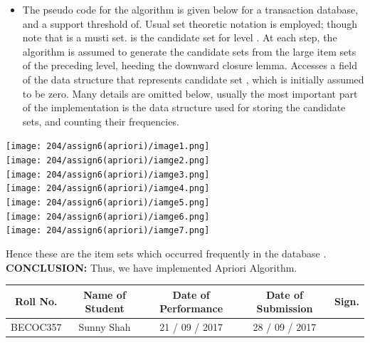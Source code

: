 \documentclass[11pt]{article}
\begin{document}
	\begin{itemize}
		\item The pseudo code for the algorithm is given below for a transaction database, and a
		support threshold of. Usual set theoretic notation is employed; though note that is a musti
		set. is the candidate set for level . At each step, the algorithm is assumed to generate the
		candidate sets from the large item sets of the preceding level, heeding the downward
		closure lemma. Accesses a field of the data structure that represents candidate set , which
		is initially assumed to be zero. Many details are omitted below, usually the most
		important part of the implementation is the data structure used for storing the candidate
		sets, and counting their frequencies.
	\end{itemize}
	
	\begin{center}
		\texttt{[image: 204/assign6(apriori)/image1.png]} \\
		\texttt{[image: 204/assign6(apriori)/iamge2.png]} \\
		\texttt{[image: 204/assign6(apriori)/iamge3.png]} \\
		\texttt{[image: 204/assign6(apriori)/iamge4.png]} \\
		\texttt{[image: 204/assign6(apriori)/iamge5.png]} \\
		\texttt{[image: 204/assign6(apriori)/iamge6.png]} \\
		\texttt{[image: 204/assign6(apriori)/iamge7.png]} \\
	\end{center}
	
	Hence these are the item sets which occurred frequently in the database . \\
	
	\noindent \textbf{ CONCLUSION:}
	Thus, we have implemented Apriori Algorithm.
	
	\begin{center}
		\begin{tabular}
			{|c|c|c|c|c|}\hline
			{\bf Roll No.}		&{\bf Name of Student}	&{\bf Date of Performance}  				&{\bf Date of Submission}	&{\bf Sign.}  \\    \hline
			BECOC357	& Sunny Shah  & 21 / 09 / 2017		& 28 / 09 / 2017		&  \\ \hline
		\end{tabular}\\ 
	\end{center}
	
\end{document}
